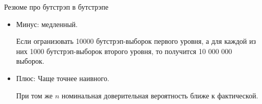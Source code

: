\begin{frame}{Резюме про бутстрэп в бутстрэпе}
  \begin{itemize}[<+->]
    \item \alert{Минус:} медленный. 
    
    Если огранизовать 10000 бутстрэп-выборок первого уровня, а для каждой из них 1000 бутстрэп-выборок второго уровня,
    то получится 10 000 000 выборок.

    \item \alert{Плюс:} Чаще точнее наивного. 
    
    При том же $n$ номинальная доверительная вероятность ближе к фактической. 
  \end{itemize}

\end{frame}